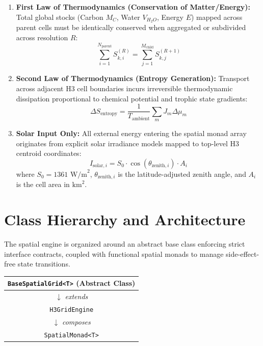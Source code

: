 \documentclass[11pt, a4paper]{article}
\begin{document}
\begin{enumerate}
    \item \textbf{First Law of Thermodynamics (Conservation of Matter/Energy):} Total global stocks (Carbon $M_C$, Water $V_{H_2O}$, Energy $E$) mapped across parent cells must be identically conserved when aggregated or subdivided across resolution $R$:
    \begin{equation}
        \sum_{i=1}^{N_{\text{parent}}} S_{k, i}^{(R)} = \sum_{j=1}^{M_{\text{child}}} S_{k, j}^{(R+1)}
    \end{equation}
    
    \item \textbf{Second Law of Thermodynamics (Entropy Generation):} Transport across adjacent H3 cell boundaries incurs irreversible thermodynamic dissipation proportional to chemical potential and trophic state gradients:
    \begin{equation}
        \Delta S_{\text{entropy}} = \frac{1}{T_{\text{ambient}}} \sum_{m} J_m \Delta \mu_m
    \end{equation}
    
    \item \textbf{Solar Input Only:} All external energy entering the spatial monad array originates from explicit solar irradiance models mapped to top-level H3 centroid coordinates:
    \begin{equation}
        I_{\text{solar}, i} = S_0 \cdot \cos(\theta_{\text{zenith}, i}) \cdot A_i
    \end{equation}
    where $S_0 = 1361 \text{ W/m}^2$, $\theta_{\text{zenith}, i}$ is the latitude-adjusted zenith angle, and $A_i$ is the cell area in $\text{km}^2$.
\end{enumerate}

\section{Class Hierarchy and Architecture}
The spatial engine is organized around an abstract base class enforcing strict interface contracts, coupled with functional spatial monads to manage side-effect-free state transitions.

\begin{center}
\begin{tabular}{c}
\hline
\texttt{BaseSpatialGrid<T>} (Abstract Class) \\
\hline
$\downarrow$ \textit{extends} \\
\texttt{H3GridEngine} \\
\hline
$\downarrow$ \textit{composes} \\
\texttt{SpatialMonad<T>} \\
\hline
\end{tabular}
\end{center}
\end{document}

